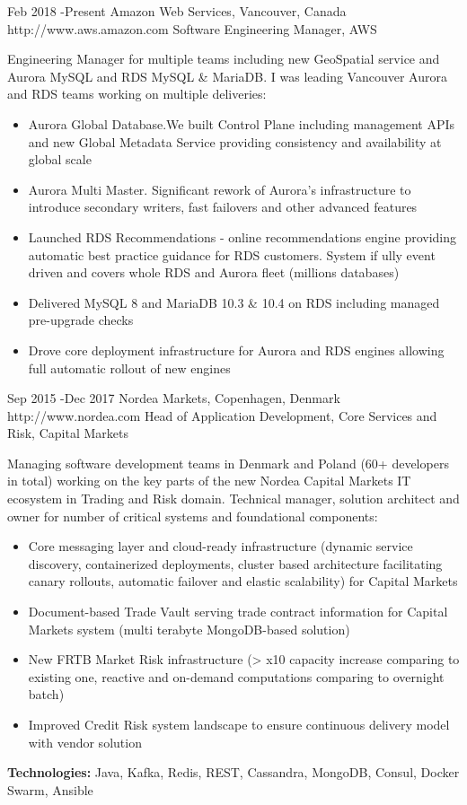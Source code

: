 \documentclass[10pt]{article} %
\begin{document}
        \job
        {Feb 2018 -}{Present}
        {Amazon Web Services, Vancouver, Canada}
        {http://www.aws.amazon.com}
        {Software Engineering Manager, AWS}
        {Engineering Manager for multiple teams including new GeoSpatial service and Aurora MySQL and RDS MySQL \& MariaDB. I was leading Vancouver Aurora and RDS teams working on multiple deliveries:
        \begin{itemize}
            \item{Aurora Global Database.We built Control Plane including management APIs and new Global Metadata Service providing consistency and availability at global scale}
            \item{Aurora Multi Master. Significant rework of Aurora's infrastructure to introduce secondary writers, fast failovers and other advanced features}
            \item{Launched RDS Recommendations - online recommendations engine providing automatic best practice guidance for RDS customers. System if ully event driven and covers whole RDS and Aurora fleet (millions databases)}
            \item{Delivered MySQL 8 and MariaDB 10.3 \& 10.4 on RDS including managed pre-upgrade checks}
            \item{Drove core deployment infrastructure for Aurora and RDS engines allowing full automatic rollout of new engines}
        \end{itemize}

        }
        \job
        {Sep 2015 -}{Dec 2017}
        {Nordea Markets, Copenhagen, Denmark}
        {http://www.nordea.com}
        {Head of Application Development, Core Services and Risk, Capital Markets}
        {Managing software development teams in Denmark and Poland (60+ developers in total) working on the key parts of the new Nordea Capital Markets IT ecosystem in Trading 
        and Risk domain. Technical manager, solution architect and owner for number of critical systems and 
        foundational components:
        \begin{itemize}
            \item{Core messaging layer and cloud-ready infrastructure (dynamic service discovery, containerized deployments, cluster based architecture facilitating canary rollouts, automatic failover and elastic scalability) for Capital Markets}
            \item{Document-based Trade Vault serving trade contract information for Capital Markets system (multi
                terabyte MongoDB-based solution)}
            \item{New FRTB Market Risk infrastructure (> x10 capacity increase comparing to existing one,
                reactive and on-demand computations comparing to overnight batch)}
            \item{Improved Credit Risk system landscape to ensure continuous delivery model with vendor solution}
        \end{itemize}

        \rule{0mm}{5mm}\textbf{Technologies:} Java, Kafka, Redis, REST, Cassandra, MongoDB, Consul, Docker Swarm, Ansible}
\end{document}
